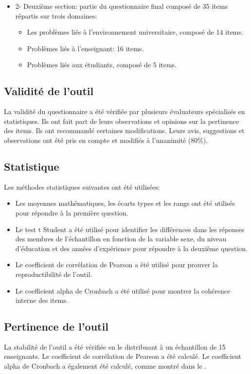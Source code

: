 \documentclass[french]{textolivre}
\begin{document}
\begin{itemize}
    \item 2- Deuxième section: partie du questionnaire final composé de 35 items répartis sur trois domaines:
    \begin{itemize}
        \item Les problèmes liés à l'environnement universitaire, composé de 14 items.
        \item Problèmes liés à l'enseignant: 16 items.
        \item Problèmes liés aux étudiants, composé de 5 items.
    \end{itemize}
\end{itemize}

\subsection{Validité de l'outil}
La validité du questionnaire a été vérifiée par plusieurs évaluateurs spécialisés en statistiques. Ils ont fait part de leurs observations et opinions sur la pertinence des items. Ils ont recommandé certaines modifications. Leurs avis, suggestions et observations ont été pris en compte et modifiés à l'unanimité (80\%).

\subsection{Statistique}
Les méthodes statistiques suivantes ont été utilisées:
\begin{itemize}
    \item Les moyennes mathématiques, les écarts types et les rangs ont été utilisés pour répondre à la première question.
    \item Le test t Student a été utilisé pour identifier les différences dans les réponses des membres de l'échantillon en fonction de la variable sexe, du niveau d'éducation et des années d'expérience pour répondre à la deuxième question.
    \item Le coefficient de corrélation de Pearson a été utilisé pour prouver la reproductibilité de l'outil.
    \item Le coefficient alpha de Cronbach a été utilisé pour montrer la cohérence interne des items.
\end{itemize}
  

\subsection{Pertinence de l'outil}
La stabilité de l'outil a été vérifiée en le distribuant à un échantillon de 15 enseignants. Le coefficient de corrélation de Pearson a été calculé. Le coefficient alpha de Cronbach a également été calculé, comme montré dans le .
\end{document}

